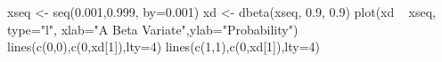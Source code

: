 \begin{Schunk}
\begin{Sinput}
  xseq <- seq(0.001,0.999, by=0.001)
  xd <- dbeta(xseq, 0.9, 0.9)
  plot(xd ~ xseq, type="l", xlab="A Beta Variate",ylab="Probability")
  lines(c(0,0),c(0,xd[1]),lty=4)
  lines(c(1,1),c(0,xd[1]),lty=4)
\end{Sinput}
\end{Schunk}
